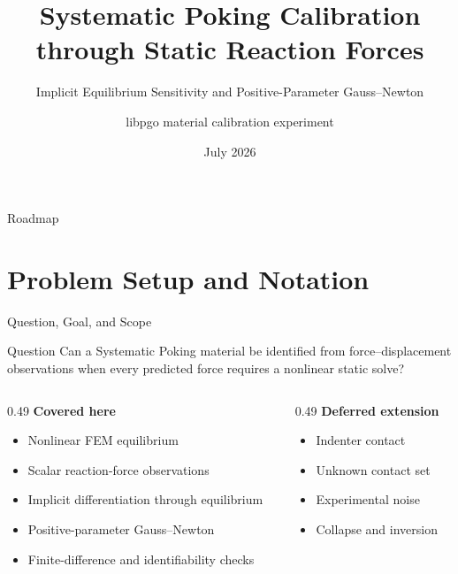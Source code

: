 \documentclass[aspectratio=169,10pt]{beamer}
\title[Equilibrium-Constrained Calibration]{Systematic Poking Calibration through Static Reaction Forces}
\subtitle{Implicit Equilibrium Sensitivity and Positive-Parameter Gauss--Newton}
\author{libpgo material calibration experiment}
\date{July 2026}
\begin{document}
\begin{frame}
  \titlepage
\end{frame}

\begin{frame}{Roadmap}
  \tableofcontents[hideallsubsections]
\end{frame}

\section{Problem Setup and Notation}

\begin{frame}{Question, Goal, and Scope}
  \begin{block}{Question}
    Can a Systematic Poking material be identified from force--displacement
    observations when every predicted force requires a nonlinear static solve?
  \end{block}

  \vspace{0.35em}
  \begin{columns}[T]
    \begin{column}{0.49\linewidth}
      \textbf{Covered here}
      \begin{itemize}
        \item Nonlinear FEM equilibrium
        \item Scalar reaction-force observations
        \item Implicit differentiation through equilibrium
        \item Positive-parameter Gauss--Newton
        \item Finite-difference and identifiability checks
      \end{itemize}
    \end{column}
    \begin{column}{0.49\linewidth}
      \textbf{Deferred extension}
      \begin{itemize}
        \item Indenter contact
        \item Unknown contact set
        \item Experimental noise
        \item Collapse and inversion
      \end{itemize}
    \end{column}
  \end{columns}
\end{frame}
\end{document}
